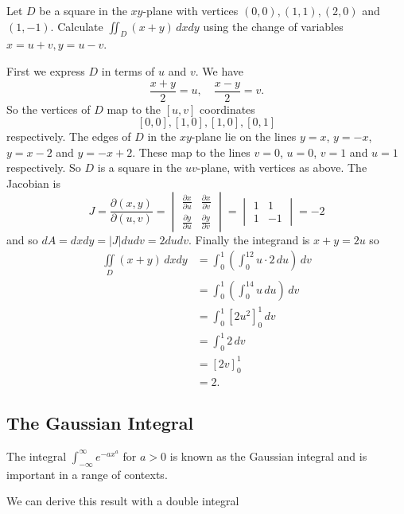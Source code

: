 \documentclass[10pt, a4paper]{article}
\begin{document}
\begin{example}
    Let $D$ be a square in the $xy$-plane with vertices $(0, 0), (1, 1), (2, 0)$ and $(1, -1)$.
    Calculate $\iint_D(x + y)\,dxdy$ using the change of variables $x = u + v, y = u - v$.

    First we express $D$ in terms of $u$ and $v$.
    We have
    \[
    \frac{x + y}{2} = u,\quad\frac{x - y}{2} = v.
    \]
    So the vertices of $D$ map to the $[u, v]$ coordinates
    \[
    [0, 0], [1, 0], [1, 0], [0, 1]
    \]
    respectively.
    The edges of $D$ in the $xy$-plane lie on the lines $y = x$, $y = -x$, $y = x - 2$ and $y = -x + 2$.
    These map to the lines $v = 0$, $u = 0$, $v = 1$ and $u = 1$ respectively.
    So $D$ is a square in the $uv$-plane,
    with vertices as above.
    The Jacobian is
    \[
    J = \frac{\partial(x, y)}{\partial(u, v)} = \begin{vmatrix}
        \frac{\partial x}{\partial u} & \frac{\partial x}{\partial v} \\
        \frac{\partial y}{\partial u} & \frac{\partial y}{\partial v}
    \end{vmatrix} = \begin{vmatrix}
        1 & 1 \\ 1 & -1
    \end{vmatrix} = -2
    \]
    and so $dA = dxdy = |J|dudv = 2dudv$.
    Finally the integrand is $x + y = 2u$ so
    \begin{align*}
        \iint\limits_D(x + y)\,dxdy &= \int_0^1\left(\int_0^12u \cdot 2\,du\right)\,dv \\
        &= \int_0^1\left(\int_0^14u\,du\right)\,dv \\
        &= \int_0^1\left[2u ^ 2\right]_0^1\,dv \\
        &= \int_0^1 2\,dv \\
        &= \left[2v\right]^1_0 \\
        &= 2.
    \end{align*}
\end{example}

\subsection{The Gaussian Integral}
The integral $\displaystyle\int_{-\infty}^{\infty}e ^ {-ax ^ a}$ for $a > 0$ is known as the Gaussian integral and is important in a range of contexts.

We can derive this result with a double integral
\end{document}
